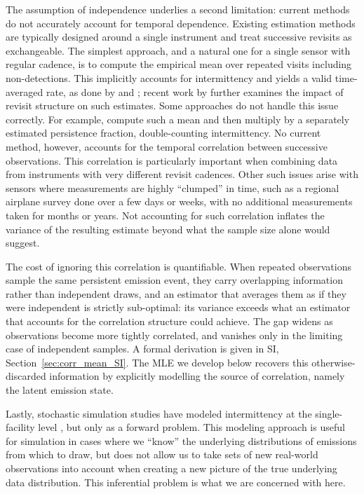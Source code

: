 \documentclass[unnumsec,webpdf,modern,mediumone]{oup-authoring-template}
\newcommand{\new}[1]{{\color{blue}#1}}
\begin{document}
The assumption of independence underlies a second limitation: current methods do not accurately account for temporal dependence. Existing estimation methods are typically designed around a single instrument and treat successive revisits as exchangeable. The simplest approach, and a natural one for a single sensor with regular cadence, is to compute the empirical mean over repeated visits including non-detections. This implicitly accounts for intermittency and yields a valid time-averaged rate, as done by \citet{Chen2022EST} and \citet{Sherwin2024Nature}\new{; recent work by \citet{Conrad2023} further examines the impact of revisit structure on such estimates}. Some approaches do not handle this issue correctly. For example, \citet{Williams2025ACP} compute such a mean and then multiply by a separately estimated persistence fraction, double-counting intermittency. No current method, however, accounts for the temporal correlation between successive observations. This correlation is particularly important when combining data from instruments with very different revisit cadences. Other such issues arise with sensors where measurements are highly ``clumped'' in time, such as a regional airplane survey done over a few days or weeks, with no additional measurements taken for months or years. Not accounting for such correlation inflates the variance of the resulting estimate beyond what the sample size alone would suggest.

\new{The cost of ignoring this correlation is quantifiable. When repeated observations sample the same persistent emission event, they carry overlapping information rather than independent draws, and an estimator that averages them as if they were independent is strictly sub-optimal: its variance exceeds what an estimator that accounts for the correlation structure could achieve. The gap widens as observations become more tightly correlated, and vanishes only in the limiting case of independent samples. A formal derivation is given in SI, Section~\ref{sec:corr_mean_SI}. The MLE we develop below recovers this otherwise-discarded information by explicitly modelling the source of correlation, namely the latent emission state.}

Lastly, stochastic simulation studies have modeled intermittency at the single-facility level \citep{Hodshire2025}, but only as a forward problem. This modeling approach is useful for simulation in cases where we ``know'' the underlying distributions of emissions from which to draw, but does not allow us to take sets of new real-world observations into account when creating a new picture of the true underlying data distribution. This inferential problem is what we are concerned with here.
\end{document}
